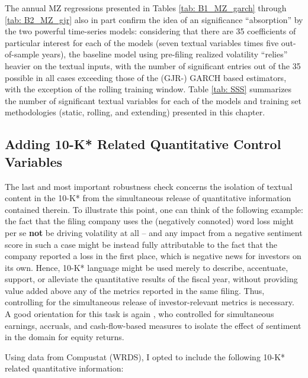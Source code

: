 The annual MZ regressions presented in Tables \ref{tab: B1_MZ_garch} through \ref{tab: B2_MZ_gjr} also in part confirm the idea of an significance \enquote{absorption} by the two powerful time-series models: considering that there are 35 coefficients of particular interest for each of the models (seven textual variables times five out-of-sample years), the baseline model using pre-filing realized volatility \enquote{relies} heavier on the textual inputs, with the number of significant entries out of the 35 possible in all cases exceeding those of the (GJR-) GARCH based estimators, with the exception of the rolling training window. Table \ref{tab: SSS} summarizes the number of significant textual variables for each of the models and training set methodologies (static, rolling, and extending) presented in this chapter.

%

\subsection{Adding 10-K* Related Quantitative Control Variables}
\label{ssec: robust_publi_quantcontrolvars}

The last and most important robustness check concerns the isolation of textual content in the 10-K* from the simultaneous release of quantitative information contained therein. To illustrate this point, one can think of the following example: the fact that the filing company uses the (negatively connoted) word \textsf{loss} might per se \textbf{not} be driving volatility at all -- and any impact from a negative sentiment score in such a case might be instead fully attributable to the fact that the company reported a loss in the first place, which is negative news for investors on its own. Hence, 10-K* language might be used merely to describe, accentuate, support, or alleviate the quantitative results of the fiscal year, without providing value added above any of the metrics reported in the same filing. Thus, controlling for the simultaneous release of investor-relevant metrics is necessary. A good orientation for this task is again \textcite{Feldman_et_al_2010}, who controlled for simultaneous earnings, accruals, and cash-flow-based measures to isolate the effect of sentiment in the domain for equity returns. 

Using data from Compustat (WRDS), I opted to include the following 10-K* related quantitative information:


